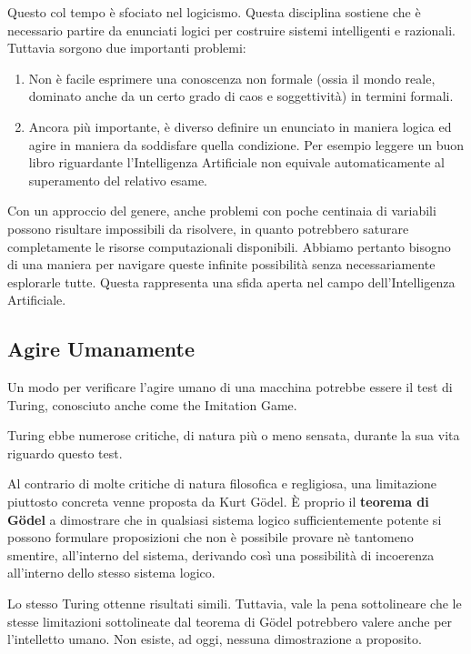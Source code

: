         Questo col tempo è sfociato nel logicismo. Questa disciplina sostiene che è necessario partire da enunciati logici per costruire sistemi intelligenti e razionali. Tuttavia sorgono due importanti problemi:
        \begin{enumerate}
            \item Non è facile esprimere una conoscenza non formale (ossia il mondo reale, dominato anche da un certo grado di caos e soggettività) in termini formali.
           \item Ancora più importante, è diverso definire un enunciato in maniera logica ed agire in maniera da soddisfare quella condizione. Per esempio leggere un buon libro riguardante l'Intelligenza Artificiale non equivale automaticamente al superamento del relativo esame.
        \end{enumerate}
            
        Con un approccio del genere, anche problemi con poche centinaia di variabili possono risultare impossibili da risolvere, in quanto potrebbero saturare completamente le risorse computazionali disponibili. Abbiamo pertanto bisogno di una maniera per navigare queste infinite possibilità senza necessariamente esplorarle tutte. Questa rappresenta una sfida aperta nel campo dell'Intelligenza Artificiale.
        
    \subsection{Agire Umanamente}
        Un modo per verificare l'agire umano di una macchina potrebbe essere il test di Turing, conosciuto anche come the Imitation Game.
        
        Turing ebbe numerose critiche, di natura più o meno sensata, durante la sua vita riguardo questo test.
        
        Al contrario di molte critiche di natura filosofica e regligiosa, una limitazione piuttosto concreta venne proposta da Kurt Gödel. È proprio il \textbf{teorema di Gödel} a dimostrare che in qualsiasi sistema logico sufficientemente potente si possono formulare proposizioni che non è possibile provare nè tantomeno smentire, all'interno del sistema, derivando così una possibilità di incoerenza all'interno dello stesso sistema logico.
        
        Lo stesso Turing ottenne risultati simili. Tuttavia, vale la pena sottolineare che le stesse limitazioni sottolineate dal teorema di Gödel potrebbero valere anche per l'intelletto umano. Non esiste, ad oggi, nessuna dimostrazione a proposito.
        
